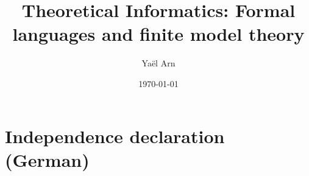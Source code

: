 \documentclass[a4paper,11pt]{report}
\title %
{Theoretical Informatics: Formal languages and finite model theory}
\date{\today}   %
\author{Yaël Arn}  %
\theoremstyle{definition}
\theoremstyle{definition}
\begin{document}


\onehalfspacing %



\newpage
{}
\tableofcontents %
\newpage %

\renewcommand{\chaptermark}[1]{\markboth{\MakeUppercase{\thechapter.\ #1}}{}} %
\renewcommand{\sectionmark}[1]{\markright{\thesection.\ #1}{}} %
\fancyhead[R]{\rightmark}
\fancyhead[L]{\leftmark}
\fancyhead[L]{\leftmark}
\fancyhead[R]{\rightmark}
\pagestyle{fancy}







\cleardoublepage %
\printbibliography %

\appendix



\chapter{Independence declaration (German)}\label{ch:appendix_independencedeclaration}



\end{document}
